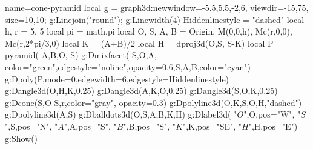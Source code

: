 \documentclass[12pt]{standalone}
\begin{document}
\begin{luadraw}{name=cone-pyramid}
local g = graph3d:new{window={-5.5,5.5,-2,6}, viewdir={-15,75}, size={10,10}};
g:Linejoin("round"); g:Linewidth(4)
Hiddenlinestyle = "dashed"
local h, r = 5, 5
local pi = math.pi
local O, S, A, B = Origin, M(0,0,h), Mc(r,0,0), Mc(r,2*pi/3,0)
local K = (A+B)/2
local H = dproj3d(O,{S, S-K})
local P = pyramid( {A,B,O}, S)
g:Dmixfacet( {S,O,A}, {color="green",edgestyle="noline",opacity=0.6},{S,A,B},{color="cyan"})
g:Dpoly(P,{mode=0,edgewidth=6,edgestyle=Hiddenlinestyle})
g:Dangle3d(O,H,K,0.25)
g:Dangle3d(A,K,O,0.25)
g:Dangle3d(S,O,K,0.25)
g:Dcone(S,O-S,r,{color="gray", opacity=0.3})
g:Dpolyline3d({{O,K,S},{O,H}},"dashed")
g:Dpolyline3d({{A,S}})
g:Dballdots3d({O,S,A,B,K,H})
g:Dlabel3d( "$O$",O,{pos="W"}, "$S$",S,{pos="N"}, "$A$",A,{pos="S"}, "$B$",B,{pos="S"}, "$K$",K,{pos="SE"}, "$H$",H,{pos="E"})
g:Show()
\end{luadraw}
\end{document}
